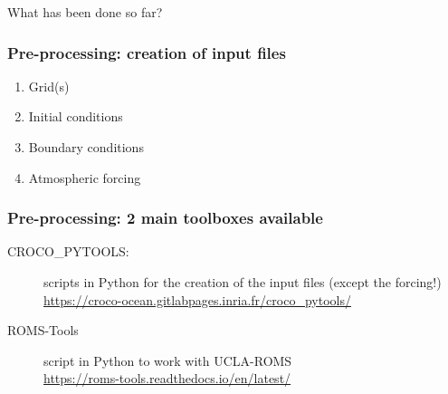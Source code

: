 {
\begin{frame}
\fontsize{50}{60}\selectfont What has been done so far?
\end{frame}
}


\begin{frame}[c]
\frametitle{Pre-processing: creation of input files}

\begin{enumerate}[label=\protect\mycirc{\color{white}\arabic*}]
\item Grid(s) 
\item Initial conditions
\item Boundary conditions
\item Atmospheric forcing
\end{enumerate}

\end{frame}


\begin{frame}[c]

\frametitle{Pre-processing: 2 main toolboxes available}

\begin{description}
\item[CROCO\_PYTOOLS:] scripts in Python for the creation of the input files (except the forcing!)\\
\url{https://croco-ocean.gitlabpages.inria.fr/croco_pytools/}
\item[ROMS-Tools] script in Python to work with UCLA-ROMS\\
\url{https://roms-tools.readthedocs.io/en/latest/}
\end{description}

\end{frame}




